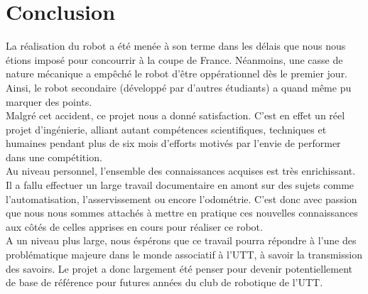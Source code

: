 \chapter{Conclusion}
    La réalisation du robot a été menée à son terme dans les délais que nous nous étions imposé pour concourrir à la coupe de France. Néanmoins, une casse de nature mécanique a empêché le robot d'être oppérationnel dès le premier jour. Ainsi, le robot secondaire (développé par d'autres étudiants) a quand même pu marquer des points.\\

    Malgré cet accident, ce projet nous a donné satisfaction. C'est en effet un réel projet d'ingénierie, alliant autant compétences scientifiques, techniques et humaines pendant plus de six mois d'efforts motivés par l'envie de performer dans une compétition.\\

    Au niveau personnel, l'ensemble des connaissances acquises est très enrichissant. Il a fallu effectuer un large travail documentaire en amont sur des sujets comme l'automatisation, l'asservissement ou encore l'odométrie. C'est donc avec passion que nous nous sommes attachés à mettre en pratique ces nouvelles connaissances aux côtés de celles apprises en cours pour réaliser ce robot.\\

    A un niveau plus large, nous éspérons que ce travail pourra répondre à l'une des problématique majeure dans le monde associatif à l'UTT, à savoir la transmission des savoirs. Le projet a donc largement été penser pour devenir potentiellement de base de référence pour futures années du club de robotique de l'UTT.